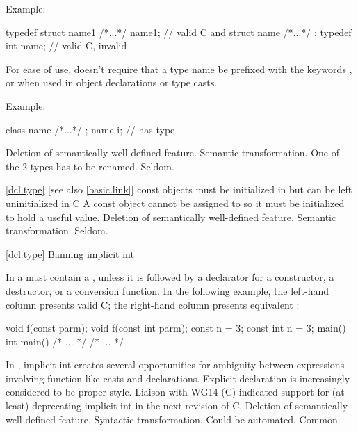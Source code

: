 Example:
\begin{codeblock}
typedef struct name1 { /*...*/ } name1;         // valid C and \Cpp
struct name { /*...*/ };
typedef int name;               // valid C, invalid \Cpp
\end{codeblock}

\rationale
For ease of use, \Cpp doesn't require that a type name be prefixed
with the keywords ,  or  when used in object
declarations or type casts.

Example:
\begin{codeblock}
class name { /*...*/ };
name i;                         //  has type 
\end{codeblock}

\effect
Deletion of semantically well-defined feature.
\difficulty
Semantic transformation.
One of the 2 types has to be renamed.
\howwide
Seldom.

\ref{dcl.type} [see also \ref{basic.link}]
\change const objects must be initialized in \Cpp but can be left uninitialized in C
\rationale
A const object cannot be assigned to so it must be initialized
to hold a useful value.
\effect
Deletion of semantically well-defined feature.
\difficulty
Semantic transformation.
\howwide
Seldom.

\ref{dcl.type}
\change Banning implicit int

In \Cpp a
must contain a
, unless
it is followed by a declarator for a constructor, a destructor, or a
conversion function.
In the following example, the
left-hand column presents valid C;
the right-hand column presents
equivalent \Cpp :

\begin{codeblock}
void f(const parm);            void f(const int parm);
const n = 3;                   const int n = 3;
main()                         int main()
    /* ... */                      /* ... */
\end{codeblock}

\rationale
In \Cpp, implicit int creates several opportunities for
ambiguity between expressions involving function-like
casts and declarations.
Explicit declaration is increasingly considered
to be proper style.
Liaison with WG14 (C) indicated support for (at least)
deprecating implicit int in the next revision of C.
\effect
Deletion of semantically well-defined feature.
\difficulty
Syntactic transformation.
Could be automated.
\howwide
Common.

